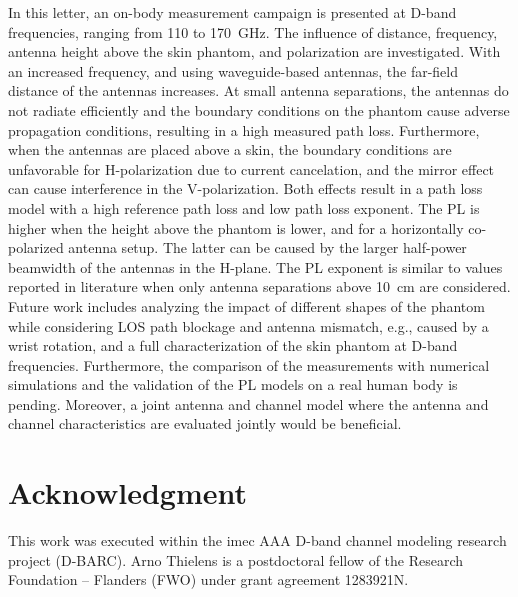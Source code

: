 \documentclass[preprint]{rsl}
\begin{document}
In this letter, an on-body measurement campaign is presented at D-band frequencies, ranging from 110 to 170~GHz. 
The influence of distance, frequency, antenna height above the skin phantom, and polarization are investigated.
With an increased frequency, and using waveguide-based antennas, the far-field distance of the antennas increases. 
At small antenna separations, the antennas do not radiate efficiently and the boundary conditions on the phantom cause adverse propagation conditions, resulting in a high measured path loss. 
Furthermore, when the antennas are placed above a skin, the boundary conditions are unfavorable for H-polarization due to current cancelation, and the mirror effect can cause interference in the V-polarization.
Both effects result in a path loss model with a high reference path loss and low path loss exponent.
The PL is higher when the height above the phantom is lower, and for a horizontally co-polarized antenna setup. 
The latter can be caused by the larger half-power beamwidth of the antennas in the H-plane.
The PL exponent is similar to values reported in literature when only antenna separations above 10~cm are considered.
%
Future work includes analyzing the impact of different shapes of the phantom while considering LOS path blockage and antenna mismatch, e.g., caused by a wrist rotation, and a full characterization of the skin phantom at D-band frequencies. 
Furthermore, the comparison of the measurements with numerical simulations and the validation of the PL models on a real human body is pending. 
Moreover, a joint antenna and channel model where the antenna and channel characteristics are evaluated jointly would be beneficial.

\section{Acknowledgment}

This work was executed within the imec AAA D-band channel modeling research project (D-BARC). 
Arno Thielens is a postdoctoral fellow of the Research Foundation – Flanders (FWO) under grant agreement 1283921N.
\vspace{3pt}

\suppressfloats
\end{document}
